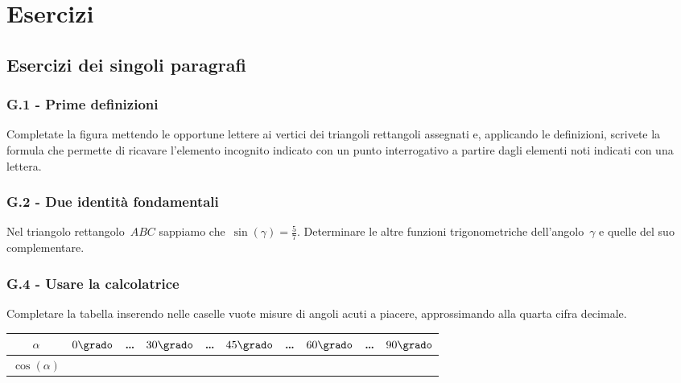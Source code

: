 
\section{Esercizi}
\subsection{Esercizi dei singoli paragrafi}
\subsubsection*{G.1 - Prime definizioni}

\begin{esercizio}
\label{ese:G.1}
Completate la figura mettendo le opportune lettere ai vertici dei triangoli rettangoli assegnati e, applicando le definizioni, scrivete la formula
che permette di ricavare l'elemento incognito indicato con un punto interrogativo a partire dagli elementi noti indicati con una lettera.
\begin{center}
 
\end{center}

\end{esercizio}

\subsubsection*{G.2 - Due identità fondamentali}

\begin{esercizio}
\label{ese:G.2}
Nel triangolo rettangolo~$ABC$ sappiamo che~$\sin(\gamma )=\frac{5}{7}$.
Determinare le altre funzioni trigonometriche dell'angolo~$\gamma$ e quelle del suo complementare.
\end{esercizio}

\subsubsection*{G.4 - Usare la calcolatrice}

\begin{esercizio}
\label{ese:G.3}
Completare la tabella inserendo nelle caselle vuote misure di angoli acuti a piacere, approssimando alla quarta cifra decimale.
\begin{center}
\begin{tabular}{cccccccccc}
\toprule
$\alpha$ & $0\grado$ & \ldots & $30\grado$ & \ldots & $45\grado$ & \ldots & $60\grado$ & \ldots & $90\grado$\\
\midrule
$\cos(\alpha)$ & & & & & & & & & \\
\bottomrule
\end{tabular}
\end{center}
\end{esercizio}

